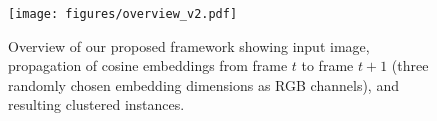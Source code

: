 \documentclass[runningheads,a4paper]{llncs}
\begin{document}

\begin{figure}[t]
\centering
\texttt{[image: figures/overview\_v2.pdf]}
\caption{Overview of our proposed framework showing input image, propagation of cosine embeddings from frame $t$ to frame $t+1$ (three randomly chosen embedding dimensions as RGB channels), and resulting clustered instances.}
\label{fig:overview}
\end{figure}
\end{document}
